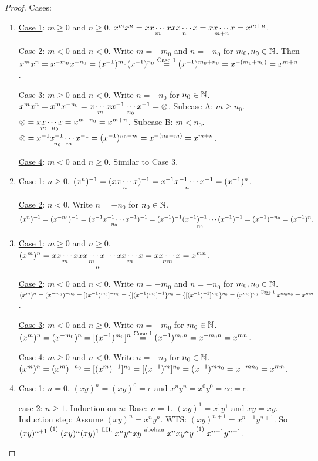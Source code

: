 \documentclass[]{article}
\begin{document}
\begin{proof}
	Cases:
	\begin{enumerate}
		\item \ul{Case 1}: $m\geq 0$ and $n\geq 0$. $x^mx^n = \underset{m}{xx\cdots x} \underset{n}{xx\cdots x} = \underset{m+n}{xx\cdots x} = x^{m+n}$.
				
			\ul{Case 2}: $m<0$ and $n<0$. Write $m = -m_0$ and $n=-n_0$ for $m_0,n_0\in\mathbb{N}$. Then $x^mx^n = x^{-m_0}x^{-n_0} = (x^{-1})^{m_0} (x^{-1})^{n_0} \overset{\text{Case 1}}{=} (x^{-1})^{m_0+n_0} = x^{-(m_0+n_0)} = x^{m+n}$.
				
			\ul{Case 3}: $m\geq 0$ and $n<0$. Write $n=-n_0$ for $n_0\in\mathbb{N}$.
			$x^mx^n = x^mx^{-n_0} = \underset{m}{x\cdots x}\underset{n_0}{x^{-1}\cdots x^{-1}} = \otimes$.
			\ul{Subcase A}: $m\geq n_0$. $\otimes = \underset{m-n_0}{xx\cdots x} = x^{m-n_0} = x^{m+n}$.
			\ul{Subcase B}: $m<n_0$. $\otimes = \underset{n_0-m}{x^{-1} x^{-1} \cdots x^{-1}} = (x^{-1})^{n_0-m} = x^{-(n_0-m)} = x^{m+n}$.

			\ul{Case 4}: $m<0$ and $n\geq 0$. Similar to Case 3.
		\item \ul{Case 1}: $n\geq 0$. $(x^n)^{-1} = (\underset{n}{xx\cdots x})^{-1} = \underset{n}{x^{-1} x^{-1} \cdots x^{-1}} = (x^{-1})^n$.

			\ul{Case 2}: $n<0$. Write $n=-n_0$ for $n_0\in\mathbb{N}$. 
			$$(x^n)^{-1} = (x^{-n_0})^{-1} = (\underset{n_0}{x^{-1} x^{-1} \cdots x^{-1}})^{-1} = \underset{n_0}{(x^{-1})^{-1} (x^{-1})^{-1}\cdots(x^{-1})^{-1}} = (x^{-1})^{-n_0} = (x^{-1})^n.$$
		\item \ul{Case 1}: $m\geq 0$ and $n\geq 0$. $(x^m)^n = \underset{n}{\underset{m}{xx\cdots x}\underset{m}{xx\cdots x}\cdots\underset{m}{xx\cdots x}} = \underset{mn}{xx\cdots x} = x^{mn}$.
				
			\ul{Case 2}: $m<0$ and $n<0$. Write $m=-m_0$ and $n = -n_0$ for $m_0,n_0\in\mathbb{N}$. $(x^m)^n = (x^{-m_0})^{-n_0} = [(x^{-1})^{m_0}]^{-n_0} = \{[(x^{-1})^{m_0}]^{-1}\}^{n_0} = \{[(x^{-1})^{-1}]^{m_0}\}^{n_0} = (x^{m_0})^{n_0} \overset{\text{Case 1}}{=} x^{m_0n_0} = x^{mn}$.

			\ul{Case 3}: $m<0$ and $n\geq 0$. Write $m=-m_0$ for $m_0\in\mathbb{N}$. $(x^m)^n = (x^{-m_0})^n = [(x^{-1})^{m_0}]^n \overset{\text{Case 1}}{=} (x^{-1})^{m_0n} = x^{-m_0n} = x^{mn}$.

			\ul{Case 4}: $m\geq 0$ and $n<0$. Write $n = -n_0$ for $n_0\in\mathbb{N}$. $(x^m)^n = (x^m)^{-n_0} = [(x^m)^{-1}]^{n_0} = [(x^{-1})^m]^{n_0} = (x^{-1})^{mn_0} = x^{-mn_0} = x^{mn}$.
		\item \ul{Case 1}: $n=0$. $(xy)^n = (xy)^0 = e$ and $x^ny^n = x^0 y^0 = ee = e$.

			\ul{case 2}: $n\geq 1$. Induction on $n$: \ul{Base}: $n=1$. $(xy)^1 = x^1 y^1$ and $xy = xy$. \ul{Induction step}: Assume $(xy)^n = x^n y^n$. WTS: $(xy)^{n+1} = x^{n+1} y^{n+1}$. So $(xy)^{n+1} \overset{(1)}{=} (xy)^n(xy)^1 \overset{\text{I.H.}}{=} x^n y^n xy \overset{\text{abelian}}{=} x^n x y^n y \overset{(1)}{=} x^{n+1}y^{n+1}$.


\end{enumerate}
\end{proof}
\end{document}
